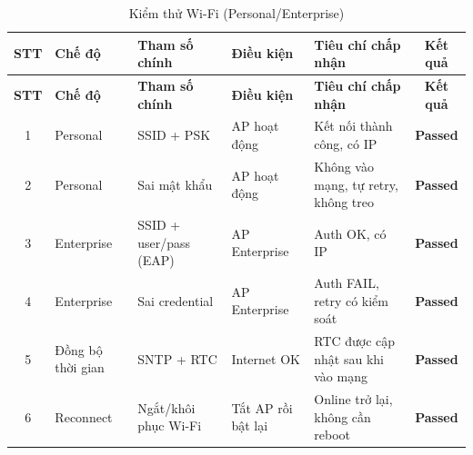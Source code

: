         \begin{longtable}{|c|p{}|p{}|p{}|p{}|c|}
            \caption{Kiểm thử Wi-Fi (Personal/Enterprise)}
            \label{tab:test_wifi} \\
            \hline
            \textbf{STT} & \textbf{Chế độ} & \textbf{Tham số chính} & \textbf{Điều kiện} & \textbf{Tiêu chí chấp nhận} & \textbf{Kết quả} \\ \hline
            \endfirsthead

            \hline
            \textbf{STT} & \textbf{Chế độ} & \textbf{Tham số chính} & \textbf{Điều kiện} & \textbf{Tiêu chí chấp nhận} & \textbf{Kết quả} \\ \hline
            \endhead

            \hline
            \endfoot
            \endlastfoot

            1 & Personal & SSID + PSK & AP hoạt động & Kết nối thành công, có IP & \textcolor{modern_blue}{\textbf{Passed}} \\ \hline
            2 & Personal & Sai mật khẩu & AP hoạt động & Không vào mạng, tự retry, không treo & \textcolor{modern_blue}{\textbf{Passed}} \\ \hline
            3 & Enterprise & SSID + user/pass (EAP) & AP Enterprise & Auth OK, có IP & \textcolor{modern_blue}{\textbf{Passed}} \\ \hline
            4 & Enterprise & Sai credential & AP Enterprise & Auth FAIL, retry có kiểm soát & \textcolor{modern_blue}{\textbf{Passed}} \\ \hline
            5 & Đồng bộ thời gian & SNTP + RTC & Internet OK & RTC được cập nhật sau khi vào mạng & \textcolor{modern_blue}{\textbf{Passed}} \\ \hline
            6 & Reconnect & Ngắt/khôi phục Wi-Fi & Tắt AP rồi bật lại & Online trở lại, không cần reboot & \textcolor{modern_blue}{\textbf{Passed}} \\ \hline
        \end{longtable}

